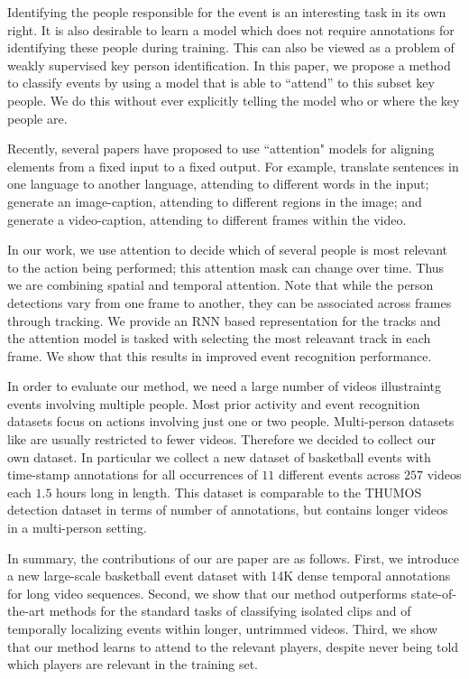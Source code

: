 Identifying the people responsible for the event is an interesting task in its
own right.  It is also desirable to learn a model which does not require
annotations for identifying these people during training. This can
also be viewed as a problem of weakly supervised key person identification. In
this paper, we propose a method  to classify events by using a model that is
able to ``attend'' to this subset key people.  We  do this without ever
explicitly telling the model who or where the key people are.

Recently, several papers have proposed to use ``attention" models for aligning
elements from a fixed input to a fixed output.  For example,
\cite{Bahdnau_arxiv14} translate sentences in one language to another language,
attending to different words in the input; \cite{Xu_arxiv15} generate an image-caption,
attending to different regions in the image; and
\cite{Yao_arxiv15} generate a video-caption, attending to different
frames within the video.


In our work, we use attention to decide which of several people is most
relevant to the action being performed; this attention mask can change over
time. Thus we are combining spatial and temporal attention.  Note that while
the person detections vary from one frame to another, they can be associated
across frames through tracking. We provide an RNN based representation for the
tracks and the attention model is tasked with selecting the most releavant
track in each frame. We show that this results in improved event recognition
performance.

In order to evaluate our method, we need a large number of videos illustraintg
events involving multiple people. Most prior activity and event
recognition datasets focus on actions involving just one or two people.
Multi-person datasets like \cite{Ryoo_ICCV09,VIRAT,Choi_ICCV09} are usually restricted to fewer videos.
Therefore we decided to collect our own dataset.
In particular we collect a new dataset of basketball events with time-stamp annotations for
all occurrences of $11$ different events across $257$ videos each $1.5$ hours
long in length.  This dataset is comparable to the THUMOS \cite{THUMOS}
detection dataset in terms of number of annotations, but contains longer videos
in a multi-person setting.

In summary, the contributions of our are paper are as follows.  First, we
introduce a new  large-scale basketball event dataset with 14K dense temporal
annotations for long video sequences.  Second, we show that our method
outperforms state-of-the-art methods for the standard tasks of classifying
isolated clips and of temporally localizing events within longer, untrimmed
videos.  Third, we show that our method learns to attend to the relevant
players, despite never being told which players are relevant in the training
set.
